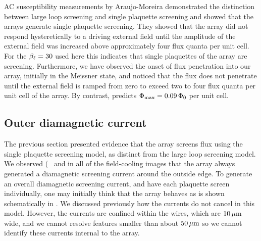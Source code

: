 AC susceptibility measurements by Araujo-Moreira \etal
\cite{araujo_prl_78_4625_1997} demonstrated the 
distinction between large loop screening and single plaquette
screening and showed that the arrays generate single plaquette
screening.
They showed that 
the array did not respond hysteretically to a driving external field
until the amplitude of the external field was increased above approximately
four flux quanta per unit cell. For the $\beta_\ell =30 $ used here this
indicates that single
plaquettes of the array are screening.  
Furthermore, we have observed the onset of 
flux penetration into our array, initially in the
Meissner state, and noticed that the flux does not penetrate until the
external field is ramped from zero to exceed two to 
four flux quanta per unit cell
of the array. By contrast,  predicts
$\Phi_{\mathrm{max}}=0.09\,\Phi_0$ per unit cell. 



\subsection{Outer diamagnetic current}

The previous section presented evidence that the array
screens flux using the single plaquette screening model, as
distinct from the large loop screening model. 
We observed 
(\cf\  and 
in all of the 
field-cooling images that the array always generated a diamagnetic 
screening current around the outside edge. To
generate an overall diamagnetic screening current,
and have each plaquette screen individually, one may initially think
that the array behaves as is shown schematically in
. We discussed previously how
the currents do not cancel in this model. However, the currents 
are confined within the wires, which are $10\,\mu\mathrm{m}$ wide, and we
cannot resolve features smaller than about $50\,\mu\mathrm{m}$ so we cannot
identify these currents internal to the array. 


